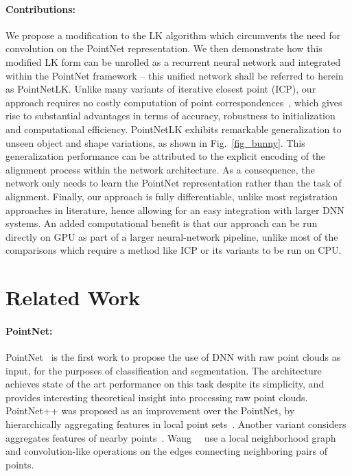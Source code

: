 \documentclass[10pt,twocolumn,letterpaper]{article}
\begin{document}
\paragraph{Contributions:}
We propose a modification to the LK algorithm which circumvents the need for convolution on the PointNet representation. We then demonstrate how this modified LK form can be unrolled as a recurrent neural network and integrated within the PointNet framework -- this unified network shall be referred to herein as PointNetLK. Unlike many variants of iterative closest point (ICP), our approach requires no costly computation of point correspondences~\cite{rusinkiewicz2001},  which gives rise to substantial advantages in terms of accuracy, robustness to initialization and computational efficiency. PointNetLK exhibits remarkable generalization to unseen object and shape variations, as shown in Fig.~\ref{fig_bunny}. This generalization performance can be attributed to the explicit encoding of the alignment process within the network architecture. As a consequence, the network only needs to learn the PointNet representation rather than the task of alignment. Finally, our approach is fully differentiable, unlike most registration approaches in literature, hence allowing for an easy integration with larger DNN systems.  An added computational benefit is that our approach can be run directly on GPU as part of a larger neural-network pipeline, unlike most of the comparisons which require a method like ICP or its variants to be run on CPU.
  

\section{Related Work}
\paragraph{PointNet:}
PointNet~\cite{qi2017pointnet} is the first work to propose the use of DNN with raw point clouds as input, for the purposes of classification and segmentation. The architecture achieves state of the art performance on this task despite its simplicity, and provides interesting theoretical insight into processing raw point clouds. PointNet++ was proposed as an improvement over the PointNet, by hierarchically aggregating features in local point sets~\cite{qi2017pointnet++}. Another variant considers aggregates features of nearby points~\cite{shen2017neighbors}. Wang~\etal~\cite{wang2018dynamic} use a local neighborhood graph and convolution-like operations on the edges connecting
neighboring pairs of points. 
\end{document}
